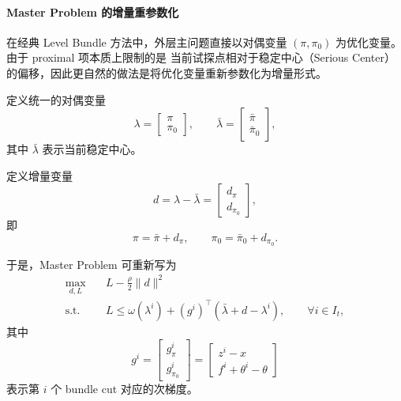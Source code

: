 \documentclass[11pt]{ctexart}
\begin{document}
\paragraph{Master Problem 的增量重参数化}

在经典 Level Bundle 方法中，外层主问题直接以对偶变量
$(\pi,\pi_0)$ 为优化变量。由于 proximal 项本质上限制的是
当前试探点相对于稳定中心（Serious Center）的偏移，因此更自然的做法是将优化变量重新参数化为增量形式。

定义统一的对偶变量
\begin{equation}
\lambda
=
\begin{bmatrix}
\pi\\
\pi_0
\end{bmatrix},
\qquad
\bar{\lambda}
=
\begin{bmatrix}
\bar{\pi}\\
\bar{\pi}_0
\end{bmatrix},
\end{equation}
其中 $\bar{\lambda}$ 表示当前稳定中心。

定义增量变量
\begin{equation}
d
=
\lambda-\bar{\lambda}
=
\begin{bmatrix}
d_{\pi}\\
d_{\pi_0}
\end{bmatrix},
\end{equation}
即
\begin{equation}
\pi=\bar{\pi}+d_{\pi},
\qquad
\pi_0=\bar{\pi}_0+d_{\pi_0}.
\end{equation}

于是，Master Problem 可重新写为
\begin{equation}
\begin{aligned}
\max_{d,L}
\quad
&
L
-
\frac{\rho}{2}\|d\|^2
\\
\text{s.t.}\quad
&
L
\le
\omega(\lambda^i)
+
(g^i)^\top
(\bar{\lambda}+d-\lambda^i),
\qquad
\forall i\in I_t,
\end{aligned}
\end{equation}
其中
\begin{equation}
g^i=
\begin{bmatrix}
g_{\pi}^i\\
g_{\pi_0}^i
\end{bmatrix}
=
\begin{bmatrix}
z^i-x\\
f^i+\theta^i-\theta
\end{bmatrix}
\end{equation}
表示第 $i$ 个 bundle cut 对应的次梯度。
\end{document}

